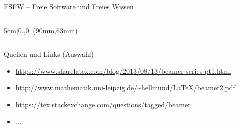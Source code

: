 \documentclass{beamer}
\begin{document}
\begin{frame}{FSFW – Freie Software und Freies Wissen}
\begin{columns}
  

\begin{textblock*}{5cm}[0.,0.](90mm,63mm)
\end{textblock*}

~
\end{columns}
\end{frame}


\begin{frame}[label=link10]{Quellen und Links (Auswahl)}
\tiny
\begin{itemize}
 \item \url{https://www.sharelatex.com/blog/2013/08/13/beamer-series-pt1.html}
 \item \url{http://www.mathematik.uni-leipzig.de/~hellmund/LaTeX/beamer2.pdf}
 \item \url{https://tex.stackexchange.com/questions/tagged/beamer}
\item ...
\end{itemize}
\end{frame}
\end{document}
